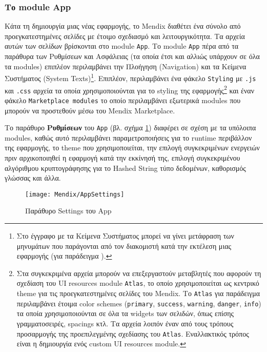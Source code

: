             \subsubsection{Το module App}
            Κάτα τη δημιουργία μιας νέας εφαρμογής, το Mendix διαθέτει ένα σύνολο από προεγκατεστημένες σελίδες με έτοιμο σχεδιασμό και λειτουργικότητα. Τα αρχεία αυτών των σελίδων βρίσκονται στο module \texttt{App}. Το module \texttt{App} πέρα από τα παράθυρα των Ρυθμίσεων και Ασφάλειας (τα οποία έτσι και αλλιώς υπάρχουν σε όλα τα modules) επιπλέον περιλαμβάνει την Πλοήγηση (Navigation) και τα Κείμενα Συστήματος (System Texts)\footnote{Στο έγγραφο με τα Κείμενα Συστήματος μπορεί να γίνει μετάφραση των μηνυμάτων που παράγονται από τον διακομιστή κατά την εκτέλεση μιας εφαρμογής (για παράδειγμα ).}. Επιπλέον, περιλαμβάνει ένα φάκελο \texttt{Styling} με \texttt{.js} και \texttt{.css} αρχεία τα οποία χρησιμοποιούνται για το styling της εφαρμογής\footnote{Στα συγκεκριμένα αρχεία μπορούν να επεξεργαστούν μεταβλητές που αφορούν τη σχεδίαση του UI resources module \texttt{Atlas}, το οποίο χρησιμοποιείται ως κεντρικό theme για τις προεγκατεστημένες σελίδες του Mendix. Το \texttt{Atlas} για παράδειγμα περιλαμβάνει έτοιμα color schemes (\texttt{primary}, \texttt{success}, \texttt{warning}, \texttt{danger}, \texttt{info}) τα οποία χρησιμοποιούνται σε όλα τα widgets των σελιδών, όπως επίσης γραμματοσειρές, spacings κτλ. Τα αρχεία λοιπόν έναν από τους τρόπους προσαρμογής της προεπιλεγμένης σχεδίασης του \texttt{Atlas}. Εναλλακτικός τρόπος είναι η δημιουργία ενός custom UI resources module.} και έναν φάκελο \texttt{Marketplace modules} το οποίο περιλαμβάνει εξωτερικά modules που μπορούν να προστεθούν μέσω του Mendix Marketplace.

            Το παράθυρο \textbf{Ρυθμίσεων} του \texttt{App} (βλ. σχήμα \ref{fig:MendixAppSettings}) διαφέρει σε σχέση με τα υπόλοιπα modules, καθώς αυτό περιλαμβάνει παραμετροποιήσεις για το runtime περιβάλλον της εφαρμογής, το theme που χρησιμοποιείται, την επιλογή συγκεκριμένων ενεργειών πριν αρχικοποιηθεί η εφαρμογή κατά την εκκίνησή της, επιλογή συγκεκριμένου αλγόριθμου κρυπτογράφησης για το Hashed String τύπο δεδομένων, καθορισμός γλώσσας και άλλα.

            \begin{figure}[h!] \noindent \centering
                \texttt{[image: Mendix/AppSettings]}
                \caption{\centering Παράθυρο Settings του App}
                \label{fig:MendixAppSettings}
            \end{figure}

